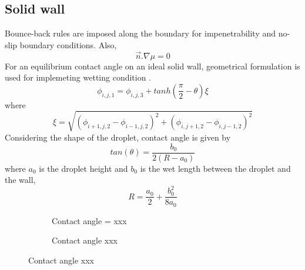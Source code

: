 \documentclass[a0,portrait]{a0poster}
\begin{document}
\begin{multicols}{3}
\section{Solid wall}
Bounce-back rules \cite{paper:bounce_back} are imposed along the boundary for impenetrability and no-slip boundary conditions. Also,
\begin{equation}
\vec{n}.\nabla\mu = 0
\end{equation}
For an equilibrium contact angle on an ideal solid wall, geometrical formulation is used for implemeting wetting condition \cite{paper:contact_angle}.
\begin{equation}
\phi_{i,j,1} = \phi_{i,j,3} + tanh(\frac{\pi}{2}-\theta) \xi
\end{equation}
where 
\begin{equation}
\xi = \sqrt{(\phi_{i+1,j,2}-\phi_{i-1,j,2})^{2}+(\phi_{i,j+1,2}-\phi_{i,j-1,2})^{2}}
\end{equation}
Considering the shape of the droplet, contact angle is given by\cite{paper:geometrical_contact_anngle} 
\begin{equation}
tan(\theta) = \frac{b_{0}}{2(R-a_{0})}
\end{equation}
where $ a_{0} $ is the droplet height and $ b_{0} $ is the wet length between the droplet and the wall,
\begin{equation}
R = \frac{a_{0}}{2} + \frac{b_{0}^{2}}{8a_{0}}
\end{equation}
\begin{figure}[H]
	\centering
	\begin{subfigure}{3cm}
		\caption{Contact angle = xxx}
	\end{subfigure}
	\begin{subfigure}{2cm}            
		\caption{Contact angle xxx}
		\label{Fig:Datsa3}
	\end{subfigure}
	

\end{figure}
\end{multicols}
\end{document}
